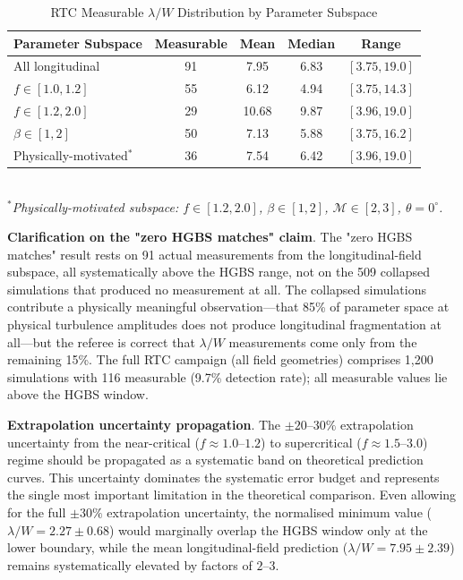 \documentclass[twocolumn,usenatbib]{mnras}
\begin{document}
\begin{table}[h]
\caption{RTC Measurable $\lambda/W$ Distribution by Parameter Subspace}
\label{tab:rtc_distribution}
\small
\begin{tabular}{lcccc}
\toprule
Parameter Subspace & Measurable & Mean & Median & Range \\
\midrule
All longitudinal & 91 & 7.95 & 6.83 & $[3.75, 19.0]$ \\
$f \in [1.0, 1.2]$ & 55 & 6.12 & 4.94 & $[3.75, 14.3]$ \\
$f \in [1.2, 2.0]$ & 29 & 10.68 & 9.87 & $[3.96, 19.0]$ \\
$\beta \in [1, 2]$ & 50 & 7.13 & 5.88 & $[3.75, 16.2]$ \\
Physically-motivated$^*$ & 36 & 7.54 & 6.42 & $[3.96, 19.0]$ \\
\bottomrule
\end{tabular}
\\
\footnotesize
\textit{$^*$Physically-motivated subspace: $f \in [1.2, 2.0]$, $\beta \in [1, 2]$, $\mathcal{M} \in [2, 3]$, $\theta = 0^{\circ}$.}
\end{table}

\textbf{Clarification on the "zero HGBS matches" claim}. The "zero HGBS matches" result rests on 91 actual measurements from the longitudinal-field subspace, all systematically above the HGBS range, not on the 509 collapsed simulations that produced no measurement at all. The collapsed simulations contribute a physically meaningful observation—that 85\% of parameter space at physical turbulence amplitudes does not produce longitudinal fragmentation at all—but the referee is correct that $\lambda/W$ measurements come only from the remaining 15\%. The full RTC campaign (all field geometries) comprises 1,200 simulations with 116 measurable (9.7\% detection rate); all measurable values lie above the HGBS window.

\textbf{Extrapolation uncertainty propagation}. The $\pm 20$--$30\%$ extrapolation uncertainty from the near-critical ($f \approx 1.0$--$1.2$) to supercritical ($f \approx 1.5$--$3.0$) regime should be propagated as a systematic band on theoretical prediction curves. This uncertainty dominates the systematic error budget and represents the single most important limitation in the theoretical comparison. Even allowing for the full $\pm 30\%$ extrapolation uncertainty, the normalised minimum value ($\lambda/W = 2.27 \pm 0.68$) would marginally overlap the HGBS window only at the lower boundary, while the mean longitudinal-field prediction ($\lambda/W = 7.95 \pm 2.39$) remains systematically elevated by factors of $2$--$3$.
\end{document}
